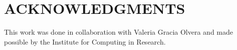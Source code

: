\documentclass[letterpaper, 11 pt, conference]{ieeeconf}
\begin{document}
\addtolength{\textheight}{-12cm}   

\section*{ACKNOWLEDGMENTS}

This work was done in collaboration with Valeria Gracia Olvera and made possible by the Institute for Computing in Research. 



\end{document}
